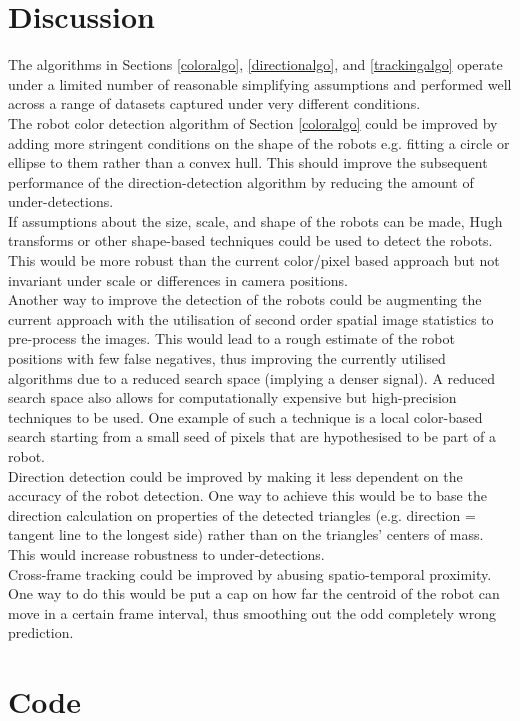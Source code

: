 \documentclass[10pt,a4paper]{article}
\begin{document}
\section{Discussion}\label{discussion}
The algorithms in Sections \ref{coloralgo}, \ref{directionalgo}, and 
\ref{trackingalgo} operate under a limited number of reasonable simplifying
assumptions and performed well across a range of datasets captured under very
different conditions.\\
The robot color detection algorithm of Section \ref{coloralgo} could be improved
by adding more stringent conditions on the shape of the robots e.g. fitting a
circle or ellipse to them rather than a convex hull. This should improve the
subsequent performance of the direction-detection algorithm by reducing the
amount of under-detections.\\
If assumptions about the size, scale, and shape of the robots can be made, Hugh 
transforms or other shape-based techniques could be used to detect the robots.
This would be more robust than the current color/pixel based approach but not 
invariant under scale or differences in camera positions.\\
Another way to improve the detection of the robots could be augmenting the
current approach with the utilisation of second order spatial image statistics
to pre-process the images. This would lead to a rough estimate of the robot
positions with few false negatives, thus improving the currently utilised
algorithms due to a reduced search space (implying a denser signal). A reduced
search space also allows for computationally expensive but high-precision 
techniques to be used. One example of such a technique is a local color-based
search starting from a small seed of pixels that are hypothesised to be part of
a robot.\\
Direction detection could be improved by making it less dependent on the
accuracy of the robot detection. One way to achieve this would be to base the 
direction calculation on properties of the detected triangles (e.g. direction =
tangent line to the longest side) rather than on the triangles' centers of 
mass. This would increase robustness to under-detections.\\
Cross-frame tracking could be improved by abusing spatio-temporal proximity. One
way to do this would be put a cap on how far the centroid of the robot can move 
in a certain frame interval, thus smoothing out the odd completely wrong 
prediction.


\section{Code}\label{code}
\end{document}
